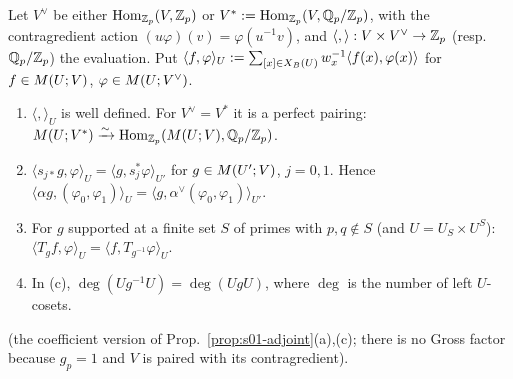 \begin{lemma}\label{lem:s03-adjoint}
Let $V^\vee$ be either $\operatorname{Hom}_{\mathbb{Z}_p}(V,\mathbb{Z}_p)$ or $V^*:=\operatorname{Hom}_{\mathbb{Z}_p}(V,\mathbb{Q}_p/\mathbb{Z}_p)$, with the contragredient action $(u\varphi)(v)=\varphi(u^{-1}v)$, and
$\langle,\rangle:V\times V^\vee\to\mathbb{Z}_p$ (resp.\ $\mathbb{Q}_p/\mathbb{Z}_p$) the evaluation. Put $\langle f,\varphi\rangle_U:=\sum_{[x]\in X_B(U)}w_x^{-1}\langle f(x),\varphi(x)\rangle$ for
$f\in M(U;V)$, $\varphi\in M(U;V^\vee)$.
\begin{enumerate}[label=(\alph*)]
\item $\langle,\rangle_U$ is well defined. For $V^\vee=V^*$ it is a perfect pairing: $M(U;V^*)\xrightarrow\sim\operatorname{Hom}_{\mathbb{Z}_p}(M(U;V),\mathbb{Q}_p/\mathbb{Z}_p)$.
\item $\langle s_{j*}g,\varphi\rangle_U=\langle g,s_j^*\varphi\rangle_{U'}$ for $g\in M(U';V)$, $j=0,1$. Hence $\langle\alpha g,(\varphi_0,\varphi_1)\rangle_U=\langle
  g,\alpha^\vee(\varphi_0,\varphi_1)\rangle_{U'}$.
\item For $g$ supported at a finite set $S$ of primes with $p,q\notin S$ (and $U=U_S\times U^S$): $\langle T_gf,\varphi\rangle_U=\langle f,T_{g^{-1}}\varphi\rangle_U$.
\item In (c), $\deg(Ug^{-1}U)=\deg(UgU)$, where $\deg$ is the number of left $U$-cosets.
\end{enumerate}
\stproved{} (the coefficient version of Prop.~\ref{prop:s01-adjoint}(a),(c); there is no Gross factor because $g_p=1$ and $V$ is paired with
its contragredient).
\end{lemma}
